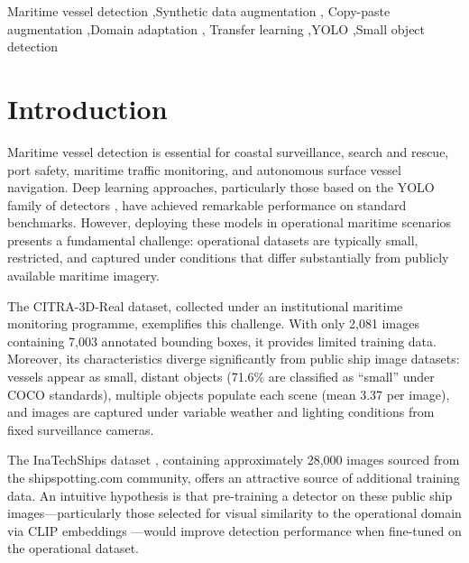 \documentclass[a4paper,fleqn]{cas-dc}
\begin{document}
\begin{keywords}
Maritime vessel detection \sep Synthetic data augmentation \sep
Copy-paste augmentation \sep Domain adaptation \sep
Transfer learning \sep YOLO \sep Small object detection
\end{keywords}

\maketitle

\section{Introduction}\label{sec:intro}

Maritime vessel detection is essential for coastal surveillance, search and rescue, port safety, maritime traffic monitoring, and autonomous surface vessel navigation. Deep learning approaches, particularly those based on the YOLO family of detectors \citep{redmon2016you, jocher2023ultralytics}, have achieved remarkable performance on standard benchmarks. However, deploying these models in operational maritime scenarios presents a fundamental challenge: operational datasets are typically small, restricted, and captured under conditions that differ substantially from publicly available maritime imagery.

The CITRA-3D-Real dataset, collected under an institutional maritime monitoring programme, exemplifies this challenge. With only 2,081 images containing 7,003 annotated bounding boxes, it provides limited training data. Moreover, its characteristics diverge significantly from public ship image datasets: vessels appear as small, distant objects (71.6\% are classified as ``small'' under COCO standards), multiple objects populate each scene (mean 3.37 per image), and images are captured under variable weather and lighting conditions from fixed surveillance cameras.

The InaTechShips dataset \citep{teixeira2025inatechships}, containing approximately 28,000 images sourced from the shipspotting.com community, offers an attractive source of additional training data. An intuitive hypothesis is that pre-training a detector on these public ship images---particularly those selected for visual similarity to the operational domain via CLIP embeddings \citep{radford2021learning}---would improve detection performance when fine-tuned on the operational dataset.
\end{document}
